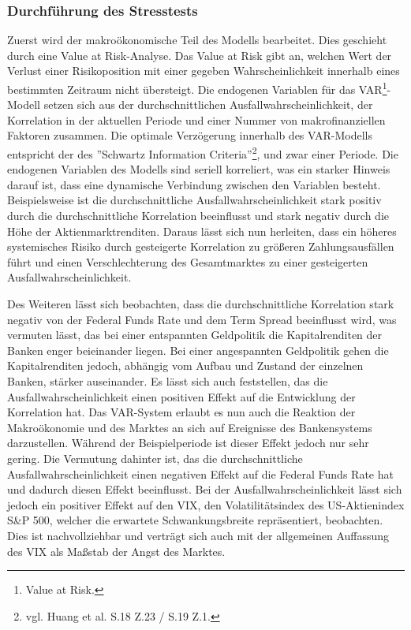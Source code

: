 \documentclass[a4paper,12pt]{scrartcl}
\begin{document}
\subsubsection{Durchführung des Stresstests}
Zuerst wird der makroökonomische Teil des Modells bearbeitet. Dies geschieht durch eine Value at Risk-Analyse. Das Value at Risk gibt an, welchen Wert der Verlust einer Risikoposition mit einer gegeben Wahrscheinlichkeit innerhalb eines bestimmten Zeitraum nicht übersteigt. 
Die endogenen Variablen für das VAR\footnote{Value at Risk.}-Modell setzen sich aus der durchschnittlichen Ausfallwahrscheinlichkeit, der Korrelation in der aktuellen Periode und einer Nummer von makrofinanziellen Faktoren zusammen. Die optimale Verzögerung innerhalb des VAR-Modells entspricht der des ''Schwartz Information Criteria''\footnote{vgl. Huang et al. S.18 Z.23 / S.19 Z.1.}, und zwar einer Periode. Die endogenen Variablen des Modells sind seriell korreliert, was ein starker Hinweis darauf ist, dass eine dynamische Verbindung zwischen den Variablen besteht. Beispielsweise ist die durchschnittliche Ausfallwahrscheinlichkeit stark positiv durch die durchschnittliche Korrelation beeinflusst und stark negativ durch die Höhe der Aktienmarktrenditen.
Daraus lässt sich nun herleiten, dass ein höheres systemisches Risiko durch gesteigerte Korrelation zu größeren Zahlungsausfällen führt und einen Verschlechterung des Gesamtmarktes zu einer gesteigerten Ausfallwahrscheinlichkeit.

Des Weiteren lässt sich beobachten, dass die durchschnittliche Korrelation stark negativ von der Federal Funds Rate und dem Term Spread beeinflusst wird, was vermuten lässt, das bei einer entspannten Geldpolitik die Kapitalrenditen der Banken enger beieinander liegen. Bei einer angespannten Geldpolitik gehen die Kapitalrenditen jedoch, abhängig vom Aufbau und Zustand der einzelnen Banken, stärker auseinander.  
Es lässt sich auch feststellen, das die Ausfallwahrscheinlichkeit einen positiven Effekt auf die Entwicklung der Korrelation hat.
Das VAR-System erlaubt es nun auch die Reaktion der Makroökonomie und des Marktes an sich auf Ereignisse des Bankensystems darzustellen. Während der Beispielperiode ist dieser Effekt jedoch nur sehr gering. Die Vermutung dahinter ist, das die durchschnittliche Ausfallwahrscheinlichkeit einen negativen Effekt auf die Federal Funds Rate hat und dadurch diesen Effekt beeinflusst.
Bei der Ausfallwahrscheinlichkeit lässt sich jedoch ein positiver Effekt auf den VIX, den Volatilitätsindex des US-Aktienindex S\&P 500, welcher die erwartete Schwankungsbreite repräsentiert, beobachten. Dies ist nachvollziehbar und verträgt sich auch mit der allgemeinen Auffassung des VIX als Maßstab der Angst des Marktes. 
\end{document}
